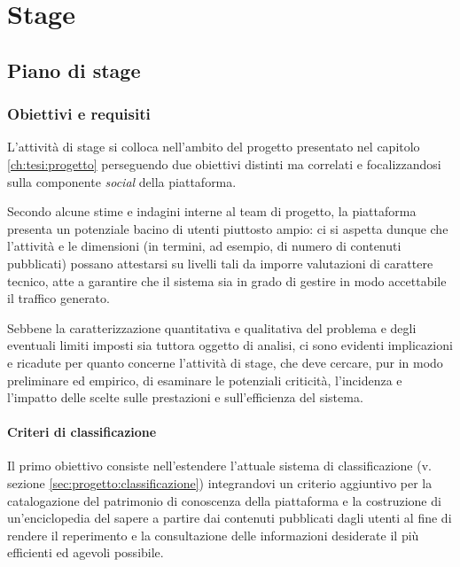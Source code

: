 \chapter{Stage}
\label{ch:tesi:stage}

\section{Piano di stage}
\label{sec:tesi:stage:piano}

\subsection{Obiettivi e requisiti}
\label{sec:tesi:stage:piano:obiettivi}
L'attività di stage si colloca nell'ambito del progetto presentato nel capitolo \ref{ch:tesi:progetto} perseguendo due obiettivi distinti ma correlati e focalizzandosi sulla componente \textit{social} della piattaforma.

Secondo alcune stime e indagini interne al team di progetto, la piattaforma presenta un potenziale bacino di utenti piuttosto ampio: ci si aspetta dunque che l'attività e le dimensioni (in termini, ad esempio, di numero di contenuti pubblicati) possano attestarsi su livelli tali da imporre valutazioni di carattere tecnico, atte a garantire che il sistema sia in grado di gestire in modo accettabile il traffico generato.

Sebbene la caratterizzazione quantitativa e qualitativa del problema e degli eventuali limiti imposti sia tuttora oggetto di analisi, ci sono evidenti implicazioni e ricadute per quanto concerne l'attività di stage, che deve cercare, pur in modo preliminare ed empirico, di esaminare le potenziali criticità, l'incidenza e l'impatto delle scelte sulle prestazioni e sull'efficienza del sistema.

\subsubsection{Criteri di classificazione}
\label{sec:tesi:stage:piano:obiettivi:criteri}
Il primo obiettivo consiste nell'estendere l'attuale sistema di classificazione (v. sezione \ref{sec:progetto:classificazione}) integrandovi un criterio aggiuntivo per la catalogazione del patrimonio di conoscenza della piattaforma e la costruzione di un'enciclopedia del sapere a partire dai contenuti pubblicati dagli utenti al fine di rendere il reperimento e la consultazione delle informazioni desiderate il più efficienti ed agevoli possibile.

